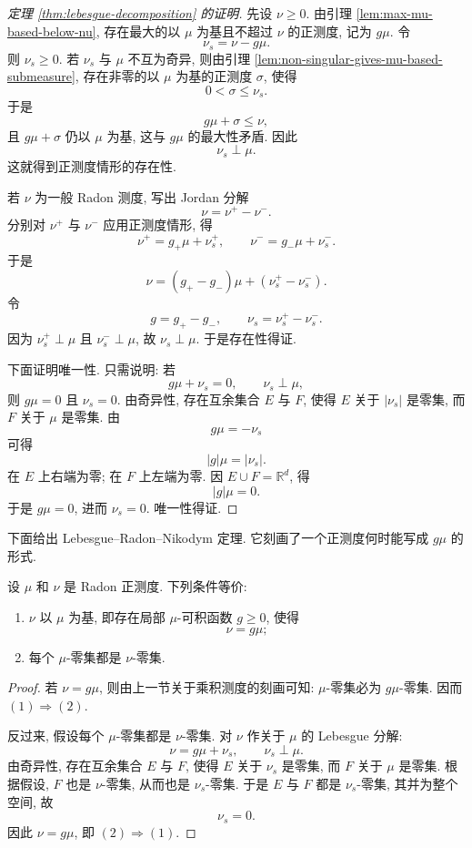 \begin{proof}[定理 \ref{thm:lebesgue-decomposition} 的证明]
	先设 \(\nu\geq0\). 由引理 \ref{lem:max-mu-based-below-nu}, 存在最大的以 \(\mu\) 为基且不超过 \(\nu\) 的正测度, 记为 \(g\mu\). 令
	\[
	\nu_s=\nu-g\mu.
	\]
	则 \(\nu_s\geq0\). 若 \(\nu_s\) 与 \(\mu\) 不互为奇异, 则由引理 \ref{lem:non-singular-gives-mu-based-submeasure}, 存在非零的以 \(\mu\) 为基的正测度 \(\sigma\), 使得
	\[
	0<\sigma\leq\nu_s.
	\]
	于是
	\[
	g\mu+\sigma\leq\nu,
	\]
	且 \(g\mu+\sigma\) 仍以 \(\mu\) 为基, 这与 \(g\mu\) 的最大性矛盾. 因此
	\[
	\nu_s\perp\mu.
	\]
	这就得到正测度情形的存在性.
	
	若 \(\nu\) 为一般 Radon 测度, 写出 Jordan 分解
	\[
	\nu=\nu^+-\nu^-.
	\]
	分别对 \(\nu^+\) 与 \(\nu^-\) 应用正测度情形, 得
	\[
	\nu^+=g_+\mu+\nu_s^+,
	\qquad
	\nu^-=g_-\mu+\nu_s^-.
	\]
	于是
	\[
	\nu=(g_+-g_-)\mu+(\nu_s^+-\nu_s^-).
	\]
	令
	\[
	g=g_+-g_-,
	\qquad
	\nu_s=\nu_s^+-\nu_s^-.
	\]
	因为 \(\nu_s^+\perp\mu\) 且 \(\nu_s^-\perp\mu\), 故 \(\nu_s\perp\mu\). 于是存在性得证.
	
	下面证明唯一性. 只需说明: 若
	\[
	g\mu+\nu_s=0,
	\qquad \nu_s\perp\mu,
	\]
	则 \(g\mu=0\) 且 \(\nu_s=0\). 由奇异性, 存在互余集合 \(E\) 与 \(F\), 使得 \(E\) 关于 \(|\nu_s|\) 是零集, 而 \(F\) 关于 \(\mu\) 是零集. 由
	\[
	g\mu=-\nu_s
	\]
	可得
	\[
	|g|\mu=|\nu_s|.
	\]
	在 \(E\) 上右端为零; 在 \(F\) 上左端为零. 因 \(E\cup F=\mathbb{R}^d\), 得
	\[
	|g|\mu=0.
	\]
	于是 \(g\mu=0\), 进而 \(\nu_s=0\). 唯一性得证.
\end{proof}

下面给出 Lebesgue--Radon--Nikodym 定理. 它刻画了一个正测度何时能写成 \(g\mu\) 的形式.

\begin{thm}
	\label{thm:lebesgue-radon-nikodym}
	设 \(\mu\) 和 \(\nu\) 是 Radon 正测度. 下列条件等价:
	\begin{enumerate}
		\item \(\nu\) 以 \(\mu\) 为基, 即存在局部 \(\mu\)-可积函数 \(g\geq0\), 使得
		\[
		\nu=g\mu;
		\]
		\item 每个 \(\mu\)-零集都是 \(\nu\)-零集.
	\end{enumerate}
\end{thm}

\begin{proof}
	若 \(\nu=g\mu\), 则由上一节关于乘积测度的刻画可知: \(\mu\)-零集必为 \(g\mu\)-零集. 因而 \((1)\Rightarrow(2)\).
	
	反过来, 假设每个 \(\mu\)-零集都是 \(\nu\)-零集. 对 \(\nu\) 作关于 \(\mu\) 的 Lebesgue 分解:
	\[
	\nu=g\mu+\nu_s,
	\qquad
	\nu_s\perp\mu.
	\]
	由奇异性, 存在互余集合 \(E\) 与 \(F\), 使得 \(E\) 关于 \(\nu_s\) 是零集, 而 \(F\) 关于 \(\mu\) 是零集. 根据假设, \(F\) 也是 \(\nu\)-零集, 从而也是 \(\nu_s\)-零集. 于是 \(E\) 与 \(F\) 都是 \(\nu_s\)-零集, 其并为整个空间, 故
	\[
	\nu_s=0.
	\]
	因此 \(\nu=g\mu\), 即 \((2)\Rightarrow(1)\).
\end{proof}

